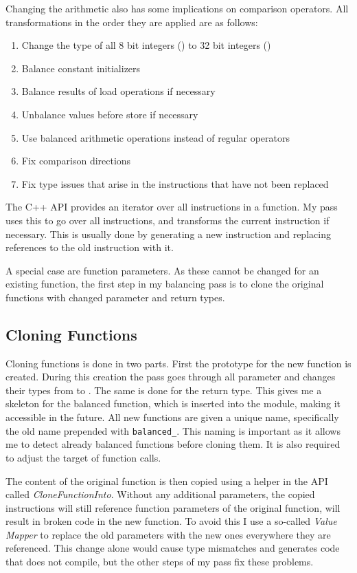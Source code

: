 Changing the arithmetic also has some implications on comparison operators.
All transformations in the order they are applied are as follows:
\begin{enumerate}
\item Change the type of all 8 bit integers () to 32 bit integers ()
\item Balance constant initializers
\item Balance results of load operations if necessary
\item Unbalance values before store if necessary
\item Use balanced arithmetic operations instead of regular operators
\item Fix comparison directions
\item Fix type issues that arise in the instructions that have not been replaced
\end{enumerate}

The \llvm{} C++ API provides an iterator over all instructions in a function.
My pass uses this to go over all instructions, and transforms the current instruction if necessary.
This is usually done by generating a new \ir{} instruction and replacing references to the old instruction with it.

A special case are function parameters.
As these cannot be changed for an existing function, the first step in my balancing pass is to clone the original functions with changed parameter and return types.

\subsection{Cloning Functions}
Cloning functions is done in two parts.
First the prototype for the new function is created.
During this creation the pass goes through all parameter and changes their types from  to .
The same is done for the return type.
This gives me a skeleton for the balanced function, which is inserted into the module, making it accessible in the future.
All new functions are given a unique name, specifically the old name prepended with \texttt{balanced\_}.
This naming is important as it allows me to detect already balanced functions before cloning them.
It is also required to adjust the target of function calls.

The content of the original function is then copied using a helper in the \llvm{} API called \emph{CloneFunctionInto}.
Without any additional parameters, the copied instructions will still reference function parameters of the original function, will result in broken code in the new function.
To avoid this I use a so-called \emph{Value Mapper} to replace the old parameters with the new ones everywhere they are referenced.
This change alone would cause type mismatches and generates code that does not compile, but the other steps of my pass fix these problems.

